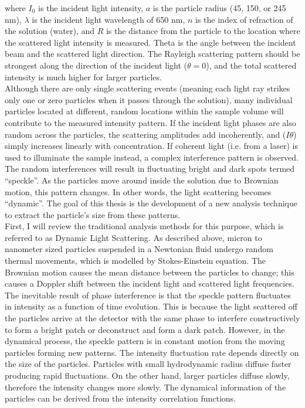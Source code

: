 where $I_0$ is the incident light intensity, $a$ is the particle radius (45, 150, or 245 nm), $\lambda$ is the incident light wavelength of 650 nm, $n$ is the index of refraction of the solution (water), and $R$ is the distance from the particle to the location where the scattered light intensity is measured.  Theta is the angle between the incident beam and the scattered light direction. The Rayleigh scattering pattern should be strongest along the direction of the incident light ($\theta = 0$), and the total scattered intensity is much higher for larger particles. \\

Although there are only single scattering events (meaning each light ray strikes only one or zero particles when it passes through the solution), many individual particles located at different, random locations within the sample volume will contribute to the measured intensity pattern.  If the incident light phases are also random across the particles, the scattering amplitudes add incoherently, and ($ I \theta$) simply increases linearly with concentration.  If coherent light (i.e. from a laser) is used to illuminate the sample instead, a complex interference pattern is observed.  The random interferences will result in fluctuating bright and dark spots termed ``speckle”. As the particles move around inside the solution due to Brownian motion, this pattern changes.  In other words, the light scattering becomes ``dynamic”.  The goal of this thesis is the development of a new analysis technique to extract the particle's size from these patterns.\\

First, I will review the traditional analysis methods for this purpose, which is referred to as Dynamic Light Scattering. As described above, micron to nanometer sized particles suspended in a Newtonian fluid undergo random thermal movements, which is modelled by Stokes-Einstein equation. The Brownian motion causes the mean distance between the particles to change; this causes a Doppler shift between the incident light and scattered light frequencies. The inevitable result of phase interference is that the speckle pattern fluctuates in intensity as a function of time evolution. This is because the light scattered off the particles arrive at the detector with the same phase to interfere constructively to form a bright patch or deconstruct and form a dark patch. However, in the dynamical process, the speckle pattern is in constant motion from the moving particles forming new patterns. The intensity fluctuation rate depends directly on the size of the particles. Particles with small hydrodynamic radius diffuse faster producing rapid fluctuations. On the other hand, larger particles diffuse slowly, therefore the intensity changes more slowly. The dynamical information of the particles can be derived from the intensity correlation functions. \\

